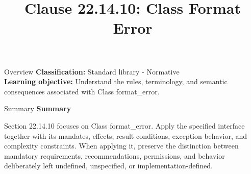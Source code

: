 \documentclass[10pt,letterpaper]{article}
\title{Clause 22.14.10: Class Format Error}
\author{}
\date{}
\begin{document}
\maketitle
\begin{CornellOverviewBox}{Overview}
\textbf{Classification:} Standard library - Normative\\[2pt]
\textbf{Learning objective:} Understand the rules, terminology, and semantic consequences associated with Class format\_error.
\end{CornellOverviewBox}\begin{CornellSummaryBox}{Summary}
{\sffamily\bfseries\color{Accent} Summary}\par\vspace{3pt}Section 22.14.10 focuses on Class format\_error. Apply the specified interface together with its mandates, effects, result conditions, exception behavior, and complexity constraints. When applying it, preserve the distinction between mandatory requirements, recommendations, permissions, and behavior deliberately left undefined, unspecified, or implementation-defined.
\end{CornellSummaryBox}
\end{document}
